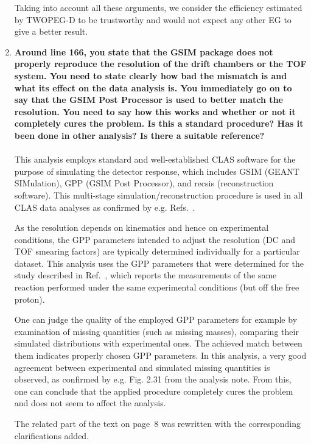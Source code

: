 \documentclass[,superscriptaddress,showpacs,amssymb,amsmath,amsfonts,linenumbers,article]{revtex4-1}
\begin{document}
\begin{enumerate}[label=\textbf{\arabic*}.]
Taking into account all these arguments, we consider the efficiency estimated by TWOPEG-D to be trustworthy and would not expect any other EG to give a better result.


\item {\bf Around line 166, you state that the GSIM package does not properly reproduce the resolution of the drift chambers or the TOF system. You need to state clearly how bad the mismatch is and what its effect on the data analysis is. You immediately go on to say that the GSIM Post Processor is used to better match the resolution. You need to say how this works and whether or not it completely cures the problem. Is this a standard procedure? Has it been done in other analysis? Is there a suitable reference?}\\ \\
This analysis employs standard and well-established CLAS software for the purpose of simulating the detector response, which includes GSIM (GEANT SIMulation), GPP (GSIM Post Processor), and recsis (reconstruction software). This multi-stage simulation/reconstruction procedure is used in all CLAS data analyses as confirmed by e.g. Refs.~\cite{Markov:2014, Arjun, Ye_Tian:2017}.

As the resolution depends on kinematics and hence on experimental conditions, the GPP parameters intended to adjust the resolution (DC and TOF smearing factors) are typically determined individually for a particular dataset. This analysis uses the GPP parameters that were determined for the study described in Ref.~\cite{fedotov_prc}, which reports the measurements of the same reaction performed under the same experimental conditions (but off the free proton).

One can judge the quality of the employed GPP parameters for example by examination of missing quantities (such as missing masses), comparing their simulated distributions with experimental ones. The achieved match between them indicates properly chosen GPP parameters. In this analysis, a very good agreement between experimental and simulated missing quantities is observed, as confirmed by e.g. Fig. 2.31 from the analysis note. From this, one can conclude that the applied procedure completely cures the problem and does not seem to affect the analysis.

The related part of the text on page~8 was rewritten with the corresponding clarifications added.



\end{enumerate}
\end{document}
